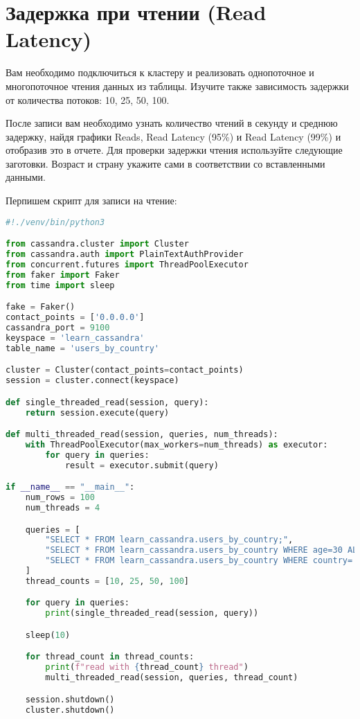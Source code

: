 \section{Задержка при чтении (Read Latency)}

Вам необходимо подключиться к кластеру и реализовать однопоточное и
многопоточное чтения данных из таблицы. Изучите также зависимость задержки
от количества потоков: 10, 25, 50, 100.\par
После записи вам необходимо узнать количество чтений в секунду и
среднюю задержку, найдя графики Reads, Read Latency (95\%) и Read Latency
(99\%) и отобразив это в отчете. Для проверки задержки чтения используйте
следующие заготовки. Возраст и страну укажите сами в соответствии со
вставленными данными.

Перпишем скрипт для записи на чтение:

\begin{lstlisting}[language=Python]
#!./venv/bin/python3

from cassandra.cluster import Cluster
from cassandra.auth import PlainTextAuthProvider
from concurrent.futures import ThreadPoolExecutor
from faker import Faker
from time import sleep

fake = Faker()
contact_points = ['0.0.0.0']
cassandra_port = 9100
keyspace = 'learn_cassandra'
table_name = 'users_by_country'

cluster = Cluster(contact_points=contact_points)
session = cluster.connect(keyspace)

def single_threaded_read(session, query):
    return session.execute(query)

def multi_threaded_read(session, queries, num_threads):
    with ThreadPoolExecutor(max_workers=num_threads) as executor:
        for query in queries:
            result = executor.submit(query)

if __name__ == "__main__":
    num_rows = 100
    num_threads = 4

    queries = [
        "SELECT * FROM learn_cassandra.users_by_country;",
        "SELECT * FROM learn_cassandra.users_by_country WHERE age=30 ALLOW FILTERING;",
        "SELECT * FROM learn_cassandra.users_by_country WHERE country='USA';"
    ]
    thread_counts = [10, 25, 50, 100]

    for query in queries:
        print(single_threaded_read(session, query))

	sleep(10)

    for thread_count in thread_counts:
        print(f"read with {thread_count} thread")
        multi_threaded_read(session, queries, thread_count)

    session.shutdown()
    cluster.shutdown()
\end{lstlisting}

